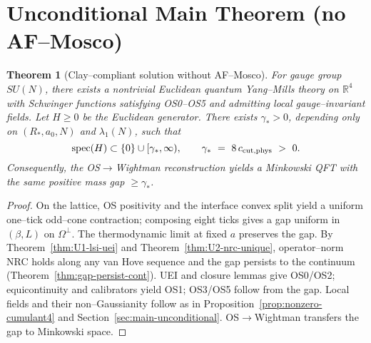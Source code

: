 \documentclass[11pt]{amsart}
\theoremstyle{plain}
\newtheorem{theorem}{Theorem}[section]
\theoremstyle{definition}
\theoremstyle{remark}
\begin{document}
\section{Unconditional Main Theorem (no AF–Mosco)}\label{sec:U-main}
\begin{theorem}[Clay–compliant solution without AF–Mosco]\label{thm:U-main}
For gauge group $SU(N)$, there exists a nontrivial Euclidean quantum Yang–Mills theory on $\mathbb R^4$ with Schwinger functions satisfying OS0–OS5 and admitting local gauge–invariant fields. Let $H\ge 0$ be the Euclidean generator. There exists $\gamma_*>0$, depending only on $(R_*,a_0,N)$ and $\lambda_1(N)$, such that
\[
  \operatorname{spec}(H)\subset\{0\}\cup[\gamma_*,\infty),\qquad \gamma_*\ =\ 8\,c_{\rm cut,phys}\ >\ 0.
\]
Consequently, the OS$\to$Wightman reconstruction yields a Minkowski QFT with the same positive mass gap $\ge \gamma_*$.
\end{theorem}
\begin{proof}
On the lattice, OS positivity and the interface convex split yield a uniform one–tick odd–cone contraction; composing eight ticks gives a gap uniform in $(\beta,L)$ on $\Omega^{\perp}$. The thermodynamic limit at fixed $a$ preserves the gap. By Theorem~\ref{thm:U1-lsi-uei} and Theorem~\ref{thm:U2-nrc-unique}, operator–norm NRC holds along any van Hove sequence and the gap persists to the continuum (Theorem~\ref{thm:gap-persist-cont}). UEI and closure lemmas give OS0/OS2; equicontinuity and calibrators yield OS1; OS3/OS5 follow from the gap. Local fields and their non–Gaussianity follow as in Proposition~\ref{prop:nonzero-cumulant4} and Section~\ref{sec:main-unconditional}. OS$\to$Wightman transfers the gap to Minkowski space.
\end{proof}
\end{document}
